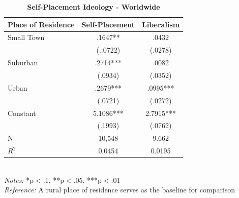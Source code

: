 \documentclass[12pt, titlepage]{article}
\newcommand\e{\emph}
\newcommand\tb{\textbf}
\begin{document}
\begin{appendices}
\begin{singlespace}
	\begin{table}[H]
		\centering
		\caption{\tb{Self-Placement Ideology - Worldwide}}
		\begin{tabulary}{\linewidth}{l c c}
			\\
			\hline
			\tb{Place of Residence}&\tb{Self-Placement}&\tb{Liberalism} \\
			\hline
			Small Town&.1647**&.0432  \\    
			& (..0722) &(.0278)  \\
			Suburban & .2714*** &.0082\\ 
			& (.0934) &(.0352) \\
			Urban   & .2679*** &.0995***  \\
			& (.0721)  &(.0272)  \\
			Constant   & 5.1086*** &2.7915*** \\
			&(.1993)&(.0762)  \\
			N  & 10,548 &9.662  \\
			$R^2$	& 0.0454&0.0195 \\
			\hline                                       
		\end{tabulary}
		\\
		\e{Notes:} *p$<$.1, **p$<$.05. ***p$<$.01 \\
		\e{Reference:} A rural place of residence serves as the baseline for comparison
		\label{table102}
	\end{table}
\end{singlespace}


\clearpage

\end{appendices}


\clearpage


\end{document}
